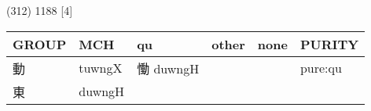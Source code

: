 \documentclass[14pt,a4paper]{scrartcl}
\begin{document}
(312) 1188 {[}4{]}

\begin{longtable}[c]{@{}llllll@{}}
\toprule
\begin{minipage}[b]{0.14\columnwidth}\raggedright\strut
GROUP
\strut\end{minipage} &
\begin{minipage}[b]{0.14\columnwidth}\raggedright\strut
MCH
\strut\end{minipage} &
\begin{minipage}[b]{0.14\columnwidth}\raggedright\strut
qu
\strut\end{minipage} &
\begin{minipage}[b]{0.14\columnwidth}\raggedright\strut
other
\strut\end{minipage} &
\begin{minipage}[b]{0.14\columnwidth}\raggedright\strut
none
\strut\end{minipage} &
\begin{minipage}[b]{0.14\columnwidth}\raggedright\strut
PURITY
\strut\end{minipage}\tabularnewline
\midrule
\endhead
\begin{minipage}[t]{0.14\columnwidth}\raggedright\strut
動
\strut\end{minipage} &
\begin{minipage}[t]{0.14\columnwidth}\raggedright\strut
tuwngX
\strut\end{minipage} &
\begin{minipage}[t]{0.14\columnwidth}\raggedright\strut
慟 duwngH
\strut\end{minipage} &
\begin{minipage}[t]{0.14\columnwidth}\raggedright\strut
\strut\end{minipage} &
\begin{minipage}[t]{0.14\columnwidth}\raggedright\strut
\strut\end{minipage} &
\begin{minipage}[t]{0.14\columnwidth}\raggedright\strut
pure:qu
\strut\end{minipage}\tabularnewline
\begin{minipage}[t]{0.14\columnwidth}\raggedright\strut
東
\strut\end{minipage} &
\begin{minipage}[t]{0.14\columnwidth}\raggedright\strut
duwngH
\strut\end{minipage} &
\begin{minipage}[t]{0.14\columnwidth}\raggedright\strut
\strut\end{minipage} &

\end{longtable}
\end{document}
